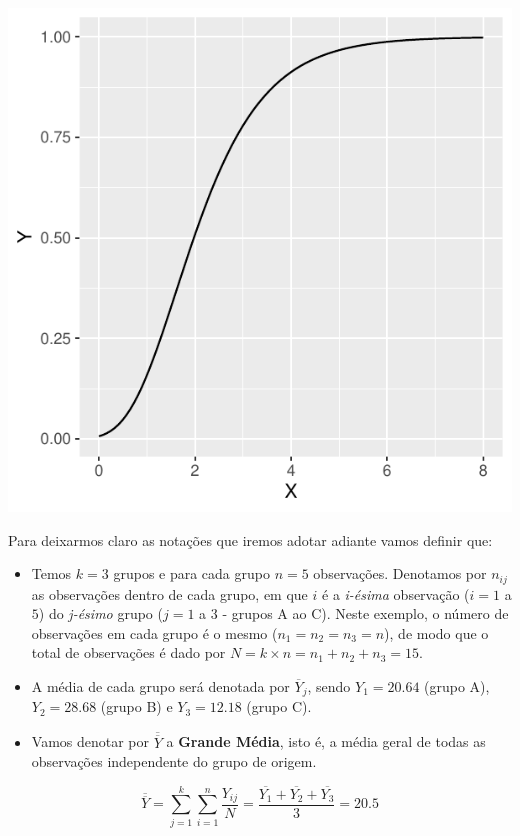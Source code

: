 \documentclass[
]{book}
\begin{document}
\begin{center}\includegraphics{probest-cambientais_files/figure-latex/unnamed-chunk-225-1} \end{center}

Para deixarmos claro as notações que iremos adotar adiante vamos definir que:

\begin{itemize}
\item
  Temos \(k = 3\) grupos e para cada grupo \(n = 5\) observações. Denotamos por \(n_{ij}\) as observações dentro de cada grupo, em que \(i\) é a \emph{i-ésima} observação (\(i = 1\) a \(5\)) do \emph{j-ésimo} grupo (\(j = 1\) a \(3\) - grupos A ao C). Neste exemplo, o número de observações em cada grupo é o mesmo (\(n_1 = n_2 = n_3 = n\)), de modo que o total de observações é dado por \(N = k \times n = n_1 + n_2 + n_3 = 15\).
\item
  A média de cada grupo será denotada por \(\overline{Y}_j\), sendo \(Y_1 = 20.64\) (grupo A), \(Y_2 = 28.68\) (grupo B) e \(Y_3 = 12.18\) (grupo C).
\item
  Vamos denotar por \(\overline{\overline{Y}}\) a \textbf{Grande Média}, isto é, a média geral de todas as observações independente do grupo de origem.
\end{itemize}

\[\overline{\overline{Y}} = \sum_{j = 1}^{k}\sum_{i = 1}^{n}\frac{Y_{ij}}{N} = \frac{\overline{Y_1} + \overline{Y_2} + \overline{Y_3}}{3} = 20.5\]
\end{document}
